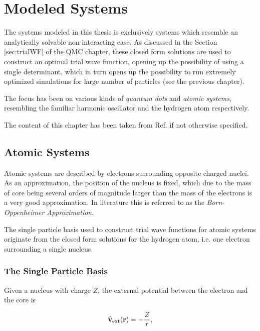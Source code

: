 \chapter{Modeled Systems}

The systems modeled in this thesis is exclusively systems which resemble an analytically solvable non-interacting case. As discussed in the Section \ref{sec:trialWF} of the QMC chapter, these closed form solutions are used to construct an optimal trial wave function, opening up the possibility of using a single determinant, which in turn opens up the possibility to run extremely optimized simulations for large number of particles (see the previous chapter). 

The focus has been on various kinds of \textit{quantum dots} and \textit{atomic systems}, resembling the familiar harmonic oscillator and the hydrogen atom respectively. 

The content of this chapter has been taken from Ref. \cite{griffiths} if not otherwise specified.

\section{Atomic Systems}

Atomic systems are described by electrons surrounding opposite charged nuclei. As an approximation, the position of the nucleus is fixed, which due to the mass of core being several orders of magnitude larger than the mass of the electrons is a very good approximation. In literature this is referred to as the \textit{Born-Oppenheimer Approximation}.

The single particle basis used to construct trial wave functions for atomic systems originate from the closed form solutions for the hydrogen atom, i.e. one electron surrounding a single nucleus.

\subsection{The Single Particle Basis}

Given a nucleus with charge $Z$, the external potential between the electron and the core is

\begin{equation}
 {\bf\widehat{v}}_\mathrm{ext}(\mathbf{r}) = -\frac{Z}{r},
\end{equation}

